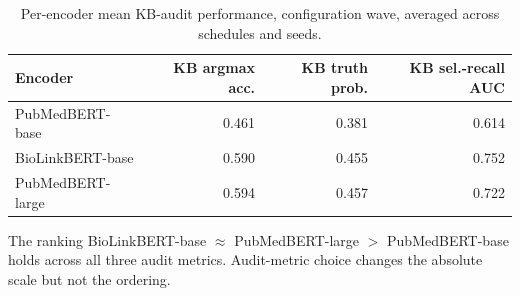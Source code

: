 \begin{table}[H]
\centering
\caption{Per-encoder mean KB-audit performance, configuration wave,
averaged across schedules and seeds.}
\label{tab:s6-encoder-means}
\small
\begin{tabular}{@{}lrrr@{}}
\toprule
\textbf{Encoder} & \textbf{KB argmax acc.} & \textbf{KB truth prob.} & \textbf{KB sel.-recall AUC} \\
\midrule
PubMedBERT-base    & 0.461 & 0.381 & 0.614 \\
BioLinkBERT-base   & 0.590 & 0.455 & 0.752 \\
PubMedBERT-large   & 0.594 & 0.457 & 0.722 \\
\bottomrule
\end{tabular}
\end{table}

The ranking BioLinkBERT-base $\approx$ PubMedBERT-large $>$
PubMedBERT-base holds across all three audit metrics. Audit-metric
choice changes the absolute scale but not the ordering.